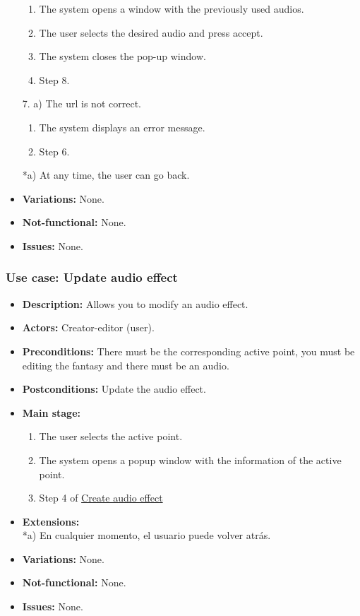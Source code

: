 \begin{itemize}
\begin{enumerate}
		\item The system opens a window with the previously used audios.
		\item The user selects the desired audio and press accept.
		\item The system closes the pop-up window.
		\item Step 8.
	\end{enumerate}
	7. a) The url is not correct.
	\begin{enumerate}
		\item The system displays an error message.
		\item Step 6.
	\end{enumerate}
	*a) At any time, the user can go back.
	\item \textbf{Variations:} None.
	\item \textbf{Not-functional:} None.
	\item \textbf{Issues:} None.
\end{itemize}

\subsubsection{Use case: Update audio effect}
\begin{itemize}
	\item \textbf{Description:} Allows you to modify an audio effect.
	\item \textbf{Actors:} Creator-editor (user).
	\item \textbf{Preconditions:} There must be the corresponding active point, you must be editing the fantasy and there must be an audio.
	\item \textbf{Postconditions:} Update the audio effect.
	\item \textbf{Main stage:}
	\begin{enumerate}
		\item The user selects the active point.
		\item The system opens a popup window with the information of the active point.
		\item Step 4 of \hyperlink{crearaudio}{Create audio effect}
	\end{enumerate}
	\item \textbf{Extensions:} \\ *a) En cualquier momento, el usuario puede volver atrás.
	\item \textbf{Variations:} None.
	\item \textbf{Not-functional:} None.
	\item \textbf{Issues:} None.
\end{itemize}

